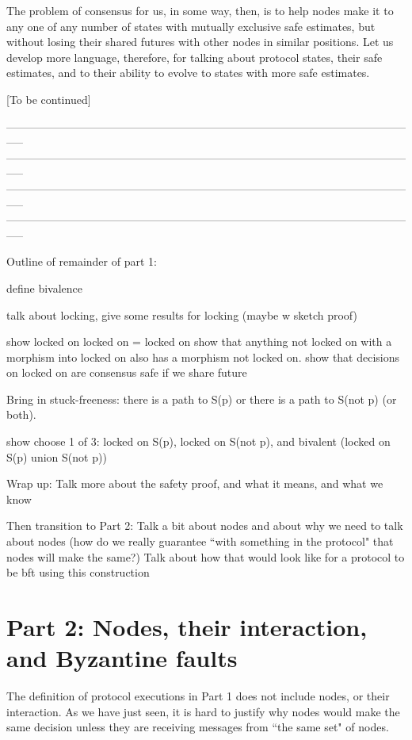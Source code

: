 \documentclass{article}
\theoremstyle{definition}
\begin{document}
The problem of consensus for us, in some way, then, is to help nodes make it to any one of any number of states with mutually exclusive safe estimates, but without losing their shared futures with other nodes in similar positions. Let us develop more language, therefore, for talking about protocol states, their safe estimates, and to their ability to evolve to states with more safe estimates.

[To be continued]

\iffalse

-----------------------------------------------------------------------------------------------------------------
-----------------------------------------------------------------------------------------------------------------
-----------------------------------------------------------------------------------------------------------------
-----------------------------------------------------------------------------------------------------------------


Outline of remainder of part 1:

define bivalence

talk about locking, give some results for locking (maybe w sketch proof)

show locked on locked on = locked on
show that anything not locked on with a morphism into locked on also has a morphism not locked on.
show that decisions on locked on are consensus safe if we share future

Bring in stuck-freeness:
  there is a path to S(p) or there is a path to S(not p) (or both).

show choose 1 of 3: locked on S(p), locked on S(not p), and bivalent (locked on S(p) union S(not p))

Wrap up:
Talk more about the safety proof, and what it means, and what we know

Then transition to Part 2:
Talk a bit about nodes and about why we need to talk about nodes (how do we really guarantee ``with something in the protocol" that nodes will make the same?)
Talk about how that would look like for a protocol to be bft using this construction


\section{Part 2: Nodes, their interaction, and Byzantine faults}

The definition of protocol executions in Part 1 does not include nodes, or their interaction. As we have just seen, it is hard to justify why nodes would make the same decision unless they are receiving messages from ``the same set" of nodes.
\end{document}
